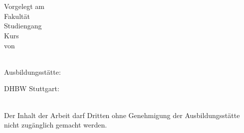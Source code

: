\documentclass[../Document.tex]{subfiles}
\begin{document}
\makeatletter
\begin{titlepage}
\begin{center}
\LARGE
\textbf{\@title}
\Large \\[2.5cm]
\papertype \\[1.5cm]
Vorgelegt am \@date \\[1.5cm]
Fakultät \faculty \\
Studiengang \studyfield \\
Kurs \studycourse \\[1.5cm]
von \\
\@author \\[1.5cm]

\begin{minipage}{0.4\textwidth}
\begin{flushleft} \large
Ausbildungsstätte:\\
\betreuer
\end{flushleft}
\end{minipage}
\begin{minipage}{0.4\textwidth}
\begin{flushright} \large
DHBW Stuttgart: \\
\pruefer
\end{flushright}
\end{minipage}
\\[3.5cm]
\ifconfidential
\large Der Inhalt der Arbeit darf Dritten ohne Genehmigung der Ausbildungsstätte
nicht zugänglich gemacht werden.
\fi
\end{center}
\end{titlepage}
\makeatother
\end{document}
